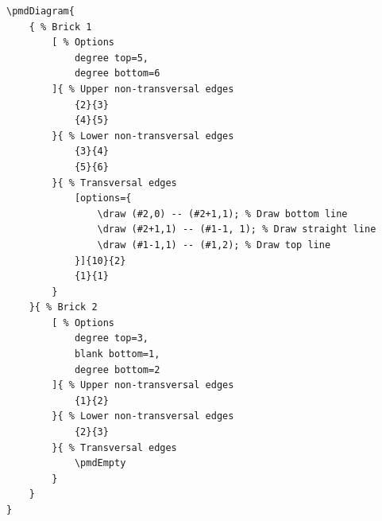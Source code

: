 \documentclass{ltxdoc}
\begin{document}
\begin{center}
    \begin{minipage}{\dimexpr0.85\textwidth-2\fboxrule-2\fboxsep\relax}
        \begin{minipage}[c]{0.4\linewidth}
\begin{verbatim}
\pmdDiagram{
    { % Brick 1
        [ % Options
            degree top=5,
            degree bottom=6
        ]{ % Upper non-transversal edges
            {2}{3}
            {4}{5}
        }{ % Lower non-transversal edges
            {3}{4}
            {5}{6}
        }{ % Transversal edges
            [options={
                \draw (#2,0) -- (#2+1,1); % Draw bottom line
                \draw (#2+1,1) -- (#1-1, 1); % Draw straight line
                \draw (#1-1,1) -- (#1,2); % Draw top line
            }]{10}{2}
            {1}{1}
        }
    }{ % Brick 2
        [ % Options
            degree top=3,
            blank bottom=1,
            degree bottom=2
        ]{ % Upper non-transversal edges
            {1}{2}
        }{ % Lower non-transversal edges
            {2}{3}
        }{ % Transversal edges
            \pmdEmpty
        }
    }
}
\end{verbatim}
        \end{minipage}
        \hfill
        \begin{minipage}[c]{0.4\linewidth}
        \end{minipage}
    \end{minipage}%
\end{center}
\begin{center}
\end{center}
\end{document}
